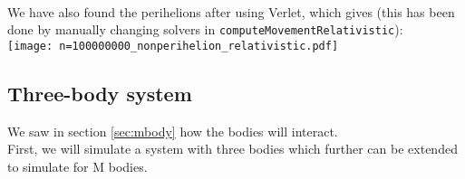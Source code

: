 \documentclass[12pt]{article}
\begin{document}
	\hfill \\ We have also found the perihelions after using Verlet, which gives (this has been done by manually changing solvers in \texttt{computeMovementRelativistic}): \\
	\centering
	\texttt{[image: n=100000000\_nonperihelion\_relativistic.pdf]}  \flushleft\hfill \\ \newpage
	\subsection{Three-body system}
	We saw in section \ref{sec:mbody} how the bodies will interact. \\First, we will simulate a system with three bodies which further can be extended to simulate for M bodies. 
\end{document}
